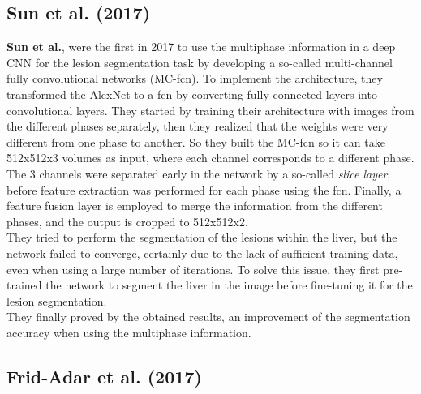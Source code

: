 \subsection*{Sun et al. (2017)}\label{sun-et-al.-2017}

\textbf{Sun et al.}, were the first in 2017 to use the multiphase
information in a deep CNN for the lesion segmentation task by developing
a so-called multi-channel fully convolutional networks (MC-\ac{fcn}). To
implement the architecture, they transformed the AlexNet to a \ac{fcn} by
converting fully connected layers into convolutional layers. They
started by training their architecture with images from the different
phases separately, then they realized that the weights were very
different from one phase to another. So they built the MC-\ac{fcn} so it can
take 512x512x3 volumes as input, where each channel corresponds to a
different phase. The 3 channels were separated early in the network by a
so-called \emph{slice layer}, before feature extraction was performed
for each phase using the \ac{fcn}. Finally, a feature fusion layer is
employed to merge the information from the different phases, and the
output is cropped to 512x512x2. \\
They tried to perform the segmentation of the lesions within the liver,
but the network failed to converge, certainly due to the lack of
sufficient training data, even when using a large number of iterations.
To solve this issue, they first pre-trained the network to segment the
liver in the image before fine-tuning it for the lesion segmentation. \\
They finally proved by the obtained results, an improvement of the
segmentation accuracy when using the multiphase information.

\subsection*{Frid-Adar et al. (2017)}\label{frid-adar-et-al.-2017}

